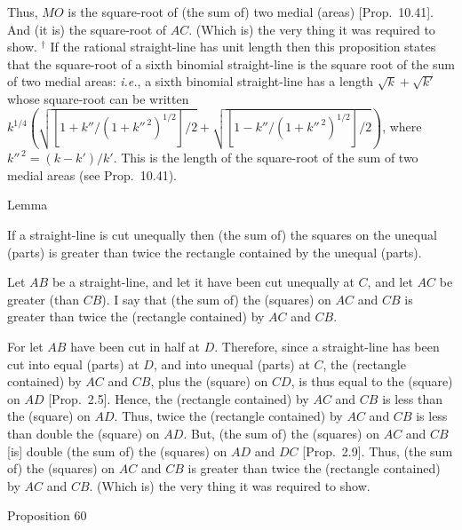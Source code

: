 Thus, $MO$ is the square-root of (the sum of) two medial (areas) [Prop.~10.41].
And (it is) the square-root of $AC$. (Which is) the very thing it was required
to show.
{\footnotesize\noindent$^\dag$ If the rational straight-line has unit length then this proposition states that the square-root of 
a sixth binomial straight-line is the square root of the sum of  two  medial areas: {\em i.e.}, 
a sixth binomial straight-line has a length $\sqrt{k}+\sqrt{k'}$ whose
square-root can be written\\ $k^{1/4}\left(\sqrt{[1+k''/(1+k''^{\,2})^{1/2}]/2}+\sqrt{[1-k''/(1+k''^{\,2})^{1/2}]/2}\right)$, where $k''^{\,2}=(k-k')/k'$. This is the length of the square-root of the sum of two medial areas (see Prop.~10.41).}~\\


\begin{center}
{\large Lemma}
\end{center}

If a straight-line is cut unequally then 
(the sum of) the squares on the unequal (parts) is greater than twice
the rectangle contained by the unequal (parts).

\epsfysize=0.3in
\centerline{}

Let $AB$ be a straight-line, and let it have been cut unequally at $C$, and
let $AC$ be greater (than $CB$). I say that (the sum of) the (squares) on
$AC$ and $CB$ is greater than twice the (rectangle contained) by $AC$ and
$CB$.

For let $AB$ have been cut in half at $D$. Therefore, since a straight-line
has been cut into equal (parts) at $D$, and into unequal (parts) at $C$,
 the (rectangle contained) by $AC$ and $CB$, plus the (square)
on $CD$, is thus equal to the (square) on $AD$ [Prop.~2.5]. Hence, the (rectangle contained) by $AC$ and $CB$ is less than the (square) on $AD$. Thus, twice the
(rectangle contained) by $AC$ and $CB$ is less than double the (square) on
$AD$. But, (the sum of) the (squares) on $AC$ and $CB$ [is] double (the sum of) the (squares) on $AD$ and $DC$ [Prop.~2.9].
Thus, (the sum of) the (squares) on $AC$ and $CB$ is greater than twice
the (rectangle contained) by $AC$ and $CB$. (Which is) the very thing it
was required to show.


\begin{center}
{\large Proposition 60}
\end{center}

